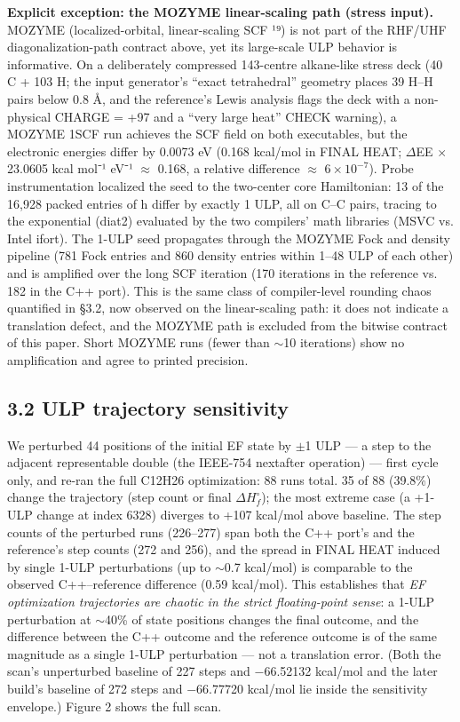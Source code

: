 \documentclass[preprint,12pt]{elsarticle}
\begin{document}
\textbf{Explicit exception: the MOZYME linear-scaling path (stress input).} MOZYME (localized-orbital, linear-scaling SCF ¹⁹) is not part of the RHF/UHF diagonalization-path contract above, yet its large-scale ULP behavior is informative. On a deliberately compressed 143-centre alkane-like stress deck (40 C + 103 H; the input generator's ``exact tetrahedral'' geometry places 39 H--H pairs below 0.8 \AA, and the reference's Lewis analysis flags the deck with a non-physical CHARGE = +97 and a ``very large heat'' CHECK warning), a MOZYME 1SCF run achieves the SCF field on both executables, but the electronic energies differ by 0.0073 eV (0.168 kcal/mol in FINAL HEAT; $\Delta$EE $\times$ 23.0605 kcal mol⁻¹ eV⁻¹ $\approx$ 0.168, a relative difference $\approx$ $6\times 10^{-7}$). Probe instrumentation localized the seed to the two-center core Hamiltonian: 13 of the 16,928 packed entries of h differ by exactly 1 ULP, all on C--C pairs, tracing to the exponential (diat2) evaluated by the two compilers' math libraries (MSVC vs. Intel ifort). The 1-ULP seed propagates through the MOZYME Fock and density pipeline (781 Fock entries and 860 density entries within 1--48 ULP of each other) and is amplified over the long SCF iteration (170 iterations in the reference vs. 182 in the C++ port). This is the same class of compiler-level rounding chaos quantified in \S{}3.2, now observed on the linear-scaling path: it does not indicate a translation defect, and the MOZYME path is excluded from the bitwise contract of this paper. Short MOZYME runs (fewer than $\sim$10 iterations) show no amplification and agree to printed precision.


\subsection{3.2 ULP trajectory sensitivity}
We perturbed 44 positions of the initial EF state by $\pm$1 ULP --- a step to the adjacent representable double (the IEEE-754 nextafter operation) --- first cycle only, and re-ran the full C12H26 optimization: 88 runs total. 35 of 88 (39.8\%) change the trajectory (step count or final $\Delta H_f^\circ$); the most extreme case (a +1-ULP change at index 6328) diverges to +107 kcal/mol above baseline. The step counts of the perturbed runs (226--277) span both the C++ port's and the reference's step counts (272 and 256), and the spread in FINAL HEAT induced by single 1-ULP perturbations (up to $\sim$0.7 kcal/mol) is comparable to the observed C++--reference difference (0.59 kcal/mol). This establishes that \textit{EF optimization trajectories are chaotic in the strict floating-point sense}: a 1-ULP perturbation at $\sim$40\% of state positions changes the final outcome, and the difference between the C++ outcome and the reference outcome is of the same magnitude as a single 1-ULP perturbation --- not a translation error. (Both the scan's unperturbed baseline of 227 steps and $-$66.52132 kcal/mol and the later build's baseline of 272 steps and $-$66.77720 kcal/mol lie inside the sensitivity envelope.) Figure 2 shows the full scan.
\end{document}
